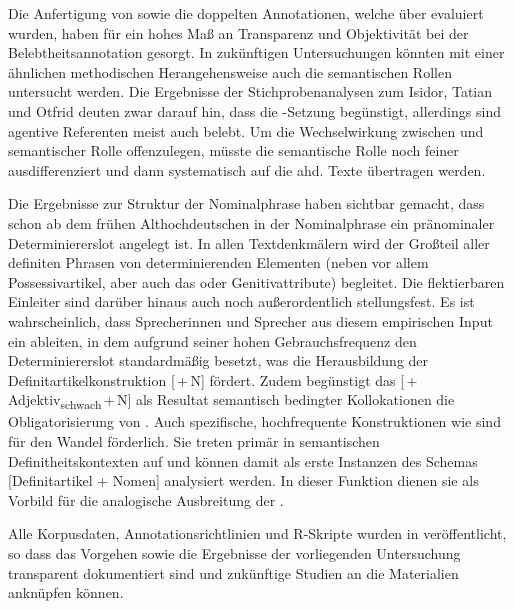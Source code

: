 Die Anfertigung von  sowie die doppelten  Annotationen, welche über  evaluiert wurden, haben für ein hohes Maß an Transparenz und Objektivität  bei der   Belebtheitsannotation  gesorgt. In zukünftigen Untersuchungen könnten mit einer ähnlichen methodischen Herangehensweise auch die semantischen Rollen  untersucht werden. Die Ergebnisse der Stichprobenanalysen zum Isidor, Tatian und Otfrid deuten zwar darauf hin, dass  die -Setzung begünstigt, allerdings sind agentive Referenten meist auch belebt. Um die Wechselwirkung zwischen  und semantischer Rolle  offenzulegen, müsste die semantische Rolle noch feiner ausdifferenziert und dann systematisch auf die ahd. Texte übertragen werden. 

Die Ergebnisse zur Struktur  der  Nominalphrase haben sichtbar gemacht, dass schon ab dem frühen Althochdeutschen in der Nominalphrase ein pränominaler  Determiniererslot  angelegt ist. In allen Textdenkmälern wird der Großteil aller definiten Phrasen von determinierenden Elementen (neben  vor allem  Possessivartikel, aber auch das   oder  Genitivattribute) begleitet. Die flektierbaren  Einleiter sind darüber hinaus auch noch außerordentlich stellungsfest. Es ist wahrscheinlich, dass Sprecherinnen und Sprecher aus diesem empirischen Input ein  ableiten, in dem  aufgrund seiner hohen Gebrauchsfrequenz den Determiniererslot standardmäßig besetzt, was die Herausbildung  der Definitartikelkonstruktion  [\,+\,N] fördert. Zudem begünstigt das   [\,+\,Adjektiv\textsubscript{schwach}\,+\,N] als Resultat semantisch bedingter Kollokationen die Obligatorisierung von . Auch spezifische, hochfrequente Konstruktionen  wie  sind für den Wandel förderlich. Sie treten primär in semantischen  Definitheitskontexten  auf und können damit als erste Instanzen des Schemas  [Definitartikel + Nomen] analysiert werden. In dieser Funktion dienen sie als Vorbild für die analogische  Ausbreitung der . 

\hspace*{-1.82977pt}Alle Korpusdaten, Annotationsrichtlinien und R-Skripte wurden in 
\textcite{HZKYL4_2020} veröffentlicht, so dass das Vorgehen sowie die Ergebnisse der  vorliegenden Untersuchung transparent dokumentiert sind und zukünftige Studien an die Materialien anknüpfen können.
